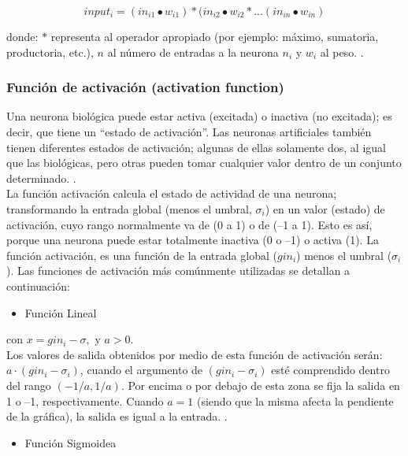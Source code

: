 \begin{equation}
input_{i}=(in_{i1} \bullet w_{i1})\ast (in_{i2} \bullet w_{i2} \ast ... (in_{in} \bullet w_{in})
\end{equation}

donde: $\ast$ representa al operador apropiado (por ejemplo: máximo, sumatoria, productoria, etc.), $n$ al número de entradas a la neurona $n_{i}$ y $w_{i}$ al peso. \citep{matich2001redes}.

\subsubsection{Función de activación (activation function)}
Una neurona biológica puede estar activa (excitada) o inactiva (no excitada); es decir, que tiene un “estado de activación”. Las neuronas artificiales también tienen diferentes estados de activación; algunas de ellas solamente dos, al igual que las biológicas, pero otras pueden tomar cualquier valor dentro de un conjunto determinado. \citep{matich2001redes}.\\
La función activación calcula el estado de actividad de una neurona; transformando la entrada global (menos el umbral, $\sigma_{i}$) en un valor (estado) de activación, cuyo rango normalmente va de (0 a 1) o de (–1 a 1). Esto es así, porque una neurona puede estar totalmente inactiva (0 o –1) o activa (1).
La función activación, es una función de la entrada global ($gin_{i}$) menos el umbral ($\sigma_{i}$). Las funciones de activación más comúnmente utilizadas se detallan a continuación:

\begin{itemize}
\item Función Lineal
\end{itemize}

con $x=gin_{i} -	\sigma, $ y $a >0.$\\
Los valores de salida obtenidos por medio de esta función de activación serán: $a\cdot(gin_{i} - \sigma_{i})$, cuando el argumento de $(gin_{i} - \sigma_{i})$ esté comprendido dentro del rango $(-1/a, 1/a)$. Por encima o por debajo de esta zona se fija la salida en 1 o –1, respectivamente.
Cuando $a = 1$ (siendo que la misma afecta la pendiente de la gráfica), la salida es igual a la entrada. \citep{matich2001redes}.

\begin{itemize}
    \item Función Sigmoidea
\end{itemize}

